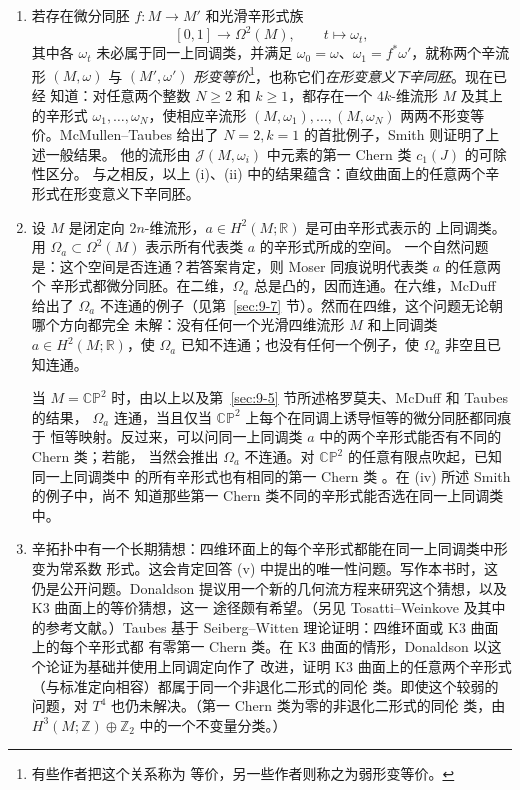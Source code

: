 \begin{remark}
\begin{enumerate}[label=(\roman*),leftmargin=3em]
\item 若存在微分同胚 $f:M\to M'$ 和光滑辛形式族
\[
  [0,1]\longrightarrow\Omega^2(M),
  \qquad t\longmapsto\omega_t,
\]
其中各 $\omega_t$ 未必属于同一上同调类，并满足
$\omega_0=\omega$、$\omega_1=f^*\omega'$，就称两个辛流形
$(M,\omega)$ 与 $(M',\omega')$ \emph{形变等价}\footnote{有些作者把这个关系称为
等价，另一些作者则称之为弱形变等价。}，也称它们\emph{在形变意义下辛同胚}。现在已经
知道：对任意两个整数 $N\ge2$ 和 $k\ge1$，都存在一个 $4k$-维流形 $M$ 及其上的辛形式
$\omega_1,\ldots,\omega_N$，使相应辛流形
$(M,\omega_1),\ldots,(M,\omega_N)$ 两两不形变等价。McMullen--Taubes
 给出了 $N=2,k=1$ 的首批例子，Smith  则证明了上述一般结果。
他的流形由 $\mathcal J(M,\omega_i)$ 中元素的第一 Chern 类 $c_1(J)$ 的可除性区分。
与之相反，以上 (i)、(ii) 中的结果蕴含：直纹曲面上的任意两个辛形式在形变意义下辛同胚。

\item 设 $M$ 是闭定向 $2n$-维流形，$a\in H^2(M;\mathbb R)$ 是可由辛形式表示的
上同调类。用 $\Omega_a\subset\Omega^2(M)$ 表示所有代表类 $a$ 的辛形式所成的空间。
一个自然问题是：这个空间是否连通？若答案肯定，则 Moser 同痕说明代表类 $a$ 的任意两个
辛形式都微分同胚。在二维，$\Omega_a$ 总是凸的，因而连通。在六维，McDuff 给出了
$\Omega_a$ 不连通的例子（见第~\ref{sec:9-7} 节）。然而在四维，这个问题无论朝哪个方向都完全
未解：没有任何一个光滑四维流形 $M$ 和上同调类 $a\in H^2(M;\mathbb R)$，使
$\Omega_a$ 已知不连通；也没有任何一个例子，使 $\Omega_a$ 非空且已知连通。

当 $M=\mathbb{CP}^2$ 时，由以上以及第~\ref{sec:9-5} 节所述格罗莫夫、McDuff 和 Taubes 的结果，
$\Omega_a$ 连通，当且仅当 $\mathbb{CP}^2$ 上每个在同调上诱导恒等的微分同胚都同痕于
恒等映射。反过来，可以问同一上同调类 $a$ 中的两个辛形式能否有不同的 Chern 类；若能，
当然会推出 $\Omega_a$ 不连通。对 $\mathbb{CP}^2$ 的任意有限点吹起，已知同一上同调类中
的所有辛形式也有相同的第一 Chern 类 。在 (iv) 所述 Smith 的例子中，尚不
知道那些第一 Chern 类不同的辛形式能否选在同一上同调类中。

\item 辛拓扑中有一个长期猜想：四维环面上的每个辛形式都能在同一上同调类中形变为常系数
形式。这会肯定回答 (v) 中提出的唯一性问题。写作本书时，这仍是公开问题。Donaldson
 提议用一个新的几何流方程来研究这个猜想，以及 K3 曲面上的等价猜想，这一
途径颇有希望。（另见 Tosatti--Weinkove  及其中的参考文献。）Taubes
 基于 Seiberg--Witten 理论证明：四维环面或 K3 曲面上的每个辛形式都
有零第一 Chern 类。在 K3 曲面的情形，Donaldson 以这个论证为基础并使用上同调定向作了
改进，证明 K3 曲面上的任意两个辛形式（与标准定向相容）都属于同一个非退化二形式的同伦
类。即使这个较弱的问题，对 $T^4$ 也仍未解决。（第一 Chern 类为零的非退化二形式的同伦
类，由 $H^3(M;\mathbb Z)\oplus\mathbb Z_2$ 中的一个不变量分类。）


\end{enumerate}
\end{remark}
